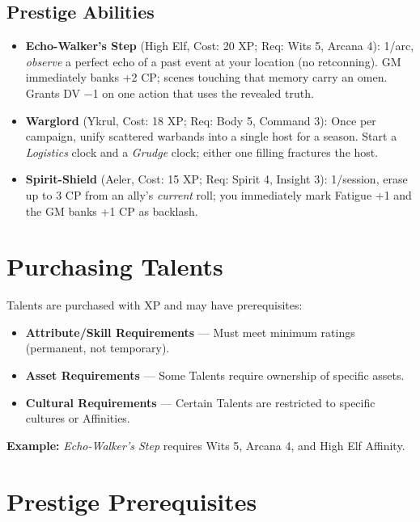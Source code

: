 \subsection*{Prestige Abilities}

\begin{itemize}
    \item \textbf{Echo-Walker's Step} (High Elf, Cost: 20 XP; Req: Wits 5, Arcana 4): 
1/arc, \emph{observe} a perfect echo of a past event at your location (no retconning). 
GM immediately banks +2 CP; scenes touching that memory carry an omen. Grants DV −1 on one action that uses the revealed truth.
    \item \textbf{Warglord} (Ykrul, Cost: 18 XP; Req: Body 5, Command 3): 
Once per campaign, unify scattered warbands into a single host for a season. Start a \emph{Logistics} clock and a \emph{Grudge} clock; either one filling fractures the host.
    \item \textbf{Spirit-Shield} (Aeler, Cost: 15 XP; Req: Spirit 4, Insight 3): 
1/session, erase up to 3 CP from an ally's \emph{current} roll; you immediately mark Fatigue +1 and the GM banks +1 CP as backlash.
\end{itemize}

\section{Purchasing Talents}

Talents are purchased with XP and may have prerequisites:

\begin{itemize}
  \item \textbf{Attribute/Skill Requirements} — Must meet minimum ratings (permanent, not temporary).
  \item \textbf{Asset Requirements} — Some Talents require ownership of specific assets.
  \item \textbf{Cultural Requirements} — Certain Talents are restricted to specific cultures or Affinities.
\end{itemize}

\textbf{Example:} \textit{Echo-Walker's Step} requires Wits 5, Arcana 4, and High Elf Affinity.

\section{Prestige Prerequisites}

